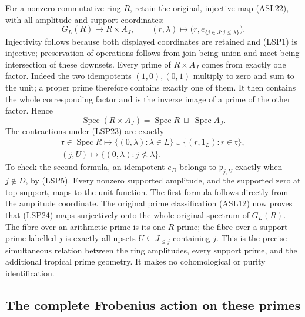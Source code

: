For a nonzero commutative ring $R$, retain the original, injective
map (ASL22), with all amplitude and support coordinates:
\begin{equation}\tag{LSP23}
 G_L(R)\longrightarrow R\times A_J,
 \qquad(r,\lambda)\longmapsto
        \bigl(r,e_{\{j\in J:j\le\lambda\}}\bigr).
\end{equation}
Injectivity follows because both displayed coordinates are retained
and (LSP1) is injective; preservation of operations follows from
join being union and meet being intersection of these downsets.
Every prime of $R\times A_J$ comes from exactly one factor.
Indeed the two idempotents $(1,0),(0,1)$ multiply to zero and sum
to the unit; a proper prime therefore contains exactly one of them.
It then contains the whole corresponding factor and is the inverse
image of a prime of the other factor. Hence
\begin{equation}\tag{LSP24}
 \operatorname{Spec}(R\times A_J)
   =\operatorname{Spec}R\ \sqcup\ \operatorname{Spec}A_J.
\end{equation}
The contractions under (LSP23) are exactly
\begin{equation}\tag{LSP25}
 \begin{gathered}
 \mathfrak r\in\operatorname{Spec}R\longmapsto
  \{(0,\lambda):\lambda\in L\}
      \cup\{(r,1_L):r\in\mathfrak r\},\\
 (j,U)\longmapsto
  \{(0,\lambda):j\nleq\lambda\}.
 \end{gathered}
\end{equation}
To check the second formula, an idempotent $e_D$ belongs to
$\mathfrak p_{j,U}$ exactly when $j\notin D$, by (LSP5).
Every nonzero supported amplitude, and the supported zero at top
support, maps to the unit function. The first formula follows
directly from the amplitude coordinate. The original prime
classification (ASL12) now proves that (LSP24) maps surjectively
onto the whole original spectrum of $G_L(R)$. The fibre over an
arithmetic prime is its one $R$-prime; the fibre over a support
prime labelled $j$ is exactly all upsets $U\subseteq J_{\le j}$
containing $j$. This is the precise simultaneous relation between
the ring amplitudes, every support prime, and the additional tropical
prime geometry. It makes no cohomological or purity identification.

\subsection{The complete Frobenius action on these primes}

